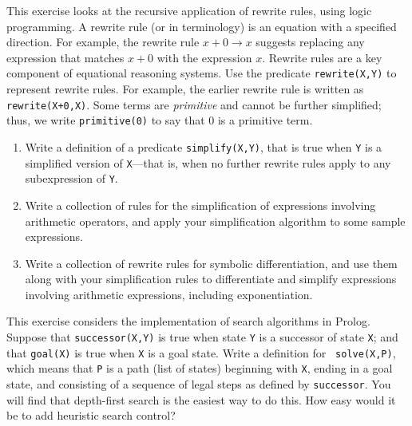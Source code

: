 \begin{exercise}%
\prgex
This exercise looks at the recursive application of
rewrite rules, using logic programming. A rewrite
rule (or  in  terminology)
is an equation with a specified direction. For example, the rewrite
rule \(x+0 \rightarrow x\) suggests replacing any expression that
matches \(x+0\) with the expression \(x\). Rewrite
rules are a key component of equational reasoning systems.
Use the predicate {\tt rewrite(X,Y)} to represent rewrite
rules. For example, the earlier rewrite rule is written as
{\tt rewrite(X+0,X)}. Some terms are {\em primitive}
and cannot be further simplified; thus, we  write
{\tt primitive(0)} to say that 0 is a primitive term.
\begin{enumerate}
\item 
Write a definition of a predicate {\tt simplify(X,Y)}, that is true when
{\tt Y} is a simplified version of {\tt X}---that is, when no further
rewrite rules apply to any subexpression of {\tt Y}.
\item 
Write a collection of rules for the simplification of expressions
involving arithmetic operators, and apply your simplification
algorithm to some sample expressions.
\item
Write a collection of rewrite rules for symbolic differentiation,
and use them along with your simplification rules to differentiate and
simplify expressions involving arithmetic expressions, including
exponentiation.
\end{enumerate}
\end{exercise} 

\begin{exercise}
This exercise considers the implementation of search
algorithms in Prolog.  Suppose that {\tt successor(X,Y)} is true when
state {\tt Y} is a successor of state {\tt X}; and that {\tt goal(X)}
is true when {\tt X} is a goal state. Write a definition for {\tt
solve(X,P)}, which means that {\tt P} is a path (list of states)
beginning with {\tt X}, ending in a goal state, and consisting of a
sequence of legal steps as defined by {\tt successor}. You will find
that depth-first search is the easiest way to do this. How easy would
it be to add heuristic search control?
\end{exercise} 



